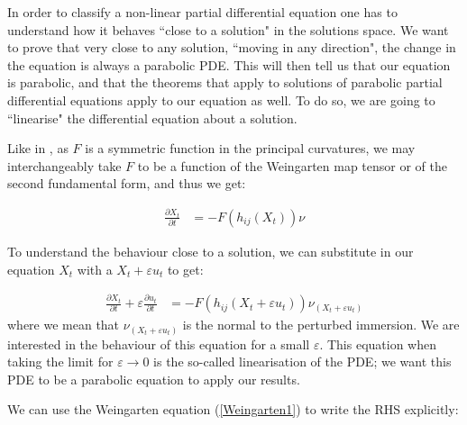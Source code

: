 In order to classify a non-linear partial differential equation one has to understand how it behaves ``close to a solution" in the solutions space. We want to prove that very close to any solution, ``moving in any direction", the change in the equation is always a parabolic PDE. This will then tell us that our equation is parabolic, and that the theorems that apply to solutions of parabolic partial differential equations apply to our equation as well. To do so, we are going to ``linearise" the differential equation about a solution.

Like in \cite{huisken}, as $F$ is a symmetric function in the principal curvatures, we may interchangeably take $F$ to be a function of the Weingarten map tensor or of the second fundamental form, and thus we get:

\begin{align*}
	\frac{\partial X_t}{\partial t} &= - F(h_{ij}(X_t)) \nu
\end{align*}

To understand the behaviour close to a solution, we can substitute in our equation $X_t$ with a $X_t+\varepsilon u_t$ to get:

\begin{align}
	\frac{\partial X_t}{\partial t} + \varepsilon\frac{\partial u_t}{\partial t}  &= - F(h_{ij}(X_t+\varepsilon u_t)) \nu_{(X_t+\varepsilon u_t)}\label{linearizingevolutioneq}
\end{align}
where we mean that  $\nu_{(X_t+\varepsilon u_t)}$ is the normal to the perturbed immersion. 
We are interested in the behaviour of this equation for a small $\varepsilon$. This equation when taking the limit for $\varepsilon \rightarrow 0$ is the so-called linearisation of the PDE; we want this PDE to be a parabolic equation to apply our results.

We can use the Weingarten equation (\ref{Weingarten1}) to write the RHS explicitly:

